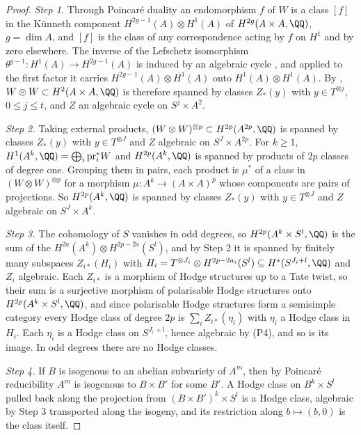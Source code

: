\begin{proof}
\emph{Step 1.} Through Poincar\'e duality an endomorphism $f$ of $W$ is a
class $[f]$ in the K\"unneth component $H^{2g-1}(A)\otimes H^{1}(A)$ of
$H^{2g}(A\times A,\QQ)$, $g=\dim A$, and $[f]$ is the class of any
correspondence acting by $f$ on $H^{1}$ and by zero elsewhere. The inverse of
the Lefschetz isomorphism $\theta^{g-1}\colon H^{1}(A)\to H^{2g-1}(A)$ is
induced by an algebraic cycle \cite[\S2]{Kle68}, and applied to the first
factor it carries $H^{2g-1}(A)\otimes H^{1}(A)$ onto
$H^{1}(A)\otimes H^{1}(A)$. By , $W\otimes W\subset
H^{2}(A\times A,\QQ)$ is therefore spanned by classes $Z_{*}(y)$ with
$y\in T^{\otimes j}$, $0\le j\le t$, and $Z$ an algebraic cycle on
$S^{j}\times A^{2}$.

\emph{Step 2.} Taking external products, $(W\otimes W)^{\otimes p}\subset
H^{2p}(A^{2p},\QQ)$ is spanned by classes $Z_{*}(y)$ with $y\in T^{\otimes J}$
and $Z$ algebraic on $S^{J}\times A^{2p}$. For $k\ge1$,
$H^{1}(A^{k},\QQ)=\bigoplus_{i}\mathrm{pr}_{i}^{*}W$ and
$H^{2p}(A^{k},\QQ)$ is spanned by products of $2p$ classes of degree one.
Grouping them in pairs, each product is $\mu^{*}$ of a class in
$(W\otimes W)^{\otimes p}$ for a morphism $\mu\colon A^{k}\to(A\times A)^{p}$
whose components are pairs of projections. So $H^{2p}(A^{k},\QQ)$ is spanned
by classes $Z_{*}(y)$ with $y\in T^{\otimes J}$ and $Z$ algebraic on
$S^{J}\times A^{k}$.

\emph{Step 3.} The cohomology of $S$ vanishes in odd degrees, so
$H^{2p}(A^{k}\times S^{l},\QQ)$ is the sum of the
$H^{2a}(A^{k})\otimes H^{2p-2a}(S^{l})$, and by Step 2 it is spanned by
finitely many subspaces $Z_{i*}(H_{i})$ with $H_{i}=T^{\otimes J_{i}}\otimes
H^{2p-2a_{i}}(S^{l})\subseteq H^{*}(S^{J_{i}+l},\QQ)$ and $Z_{i}$ algebraic.
Each $Z_{i*}$ is a morphism of Hodge structures up to a Tate twist, so their
sum is a surjective morphism of polarisable Hodge structures onto
$H^{2p}(A^{k}\times S^{l},\QQ)$, and since polarisable Hodge structures form
a semisimple category every Hodge class of degree $2p$ is
$\sum_{i}Z_{i*}(\eta_{i})$ with $\eta_{i}$ a Hodge class in $H_{i}$. Each
$\eta_{i}$ is a Hodge class on $S^{J_{i}+l}$, hence algebraic by
\textup{(P4)}, and so is its image. In odd degrees there are no Hodge
classes.

\emph{Step 4.} If $B$ is isogenous to an abelian subvariety of $A^{m}$, then
by Poincar\'e reducibility $A^{m}$ is isogenous to $B\times B'$ for some
$B'$. A Hodge class on $B^{k}\times S^{l}$ pulled back along the projection
from $(B\times B')^{k}\times S^{l}$ is a Hodge class, algebraic by Step 3
transported along the isogeny, and its restriction along
$b\mapsto(b,0)$ is the class itself.
\end{proof}

